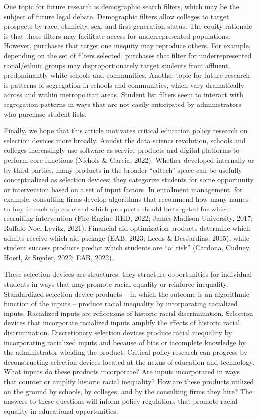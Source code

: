 \documentclass[
  12pt,
]{article}
\begin{document}
One topic for future research is demographic search filters, which may be the subject of future legal debate. Demographic filters allow colleges to target prospects by race, ethnicity, sex, and first-generation status. The equity rationale is that these filters may facilitate access for underrepresented populations. However, purchases that target one inequity may reproduce others. For example, depending on the set of filters selected, purchases that filter for underrepresented racial/ethnic groups may disproportionately target students from affluent, predominantly white schools and communities. Another topic for future research is patterns of segregation in schools and communities, which vary dramatically across and within metropolitan areas. Student list filters seem to interact with segregation patterns in ways that are not easily anticipated by administrators who purchase student lists.

Finally, we hope that this article motivates critical education policy research on selection devices more broadly. Amidst the data science revolution, schools and colleges increasingly use software-as-service products and digital platforms to perform core functions (Nichols \& Garcia, 2022). Whether developed internally or by third parties, many products in the broader ``edtech'' space can be usefully conceptualized as selection devices; they categorize students for some opportunity or intervention based on a set of input factors. In enrollment management, for example, consulting firms develop algorithms that recommend how many names to buy in each zip code and which prospects should be targeted for which recruiting intervention (Fire Engine RED, 2022; James Madison University, 2017; Ruffalo Noel Levitz, 2021). Financial aid optimization products determine which admits receive which aid package (EAB, 2023; Leeds \& DesJardins, 2015), while student success products predict which students are ``at risk'' (Cardona, Cudney, Hoerl, \& Snyder, 2022; EAB, 2022).

These selection devices are structures; they structure opportunities for individual students in ways that may promote racial equality or reinforce inequality. Standardized selection device products -- in which the outcome is an algorithmic function of the inputs -- produce racial inequality by incorporating racialized inputs. Racialized inputs are reflections of historic racial discrimination. Selection devices that incorporate racialized inputs amplify the effects of historic racial discrimination. Discretionary selection devices produce racial inequality by incorporating racialized inputs and because of bias or incomplete knowledge by the administrator wielding the product. Critical policy research can progress by deconstructing selection devices located at the nexus of education and technology. What inputs do these products incorporate? Are inputs incorporated in ways that counter or amplify historic racial inequality? How are these products utilized on the ground by schools, by colleges, and by the consulting firms they hire? The answers to these questions will inform policy regulations that promote racial equality in educational opportunities.
\end{document}
